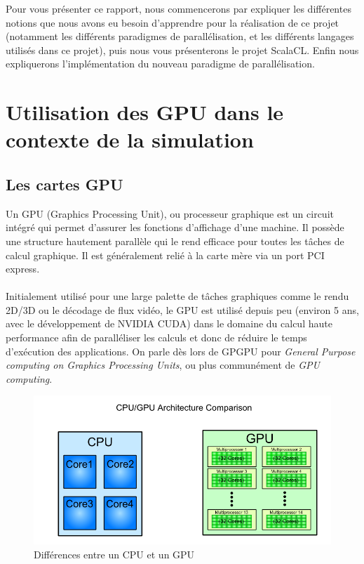 \documentclass[a4paper,11pt]{report}
\begin{document}
\normalsize{
Pour vous présenter ce rapport, nous commencerons par expliquer les différentes notions que nous avons eu besoin d'apprendre pour la réalisation de ce projet (notamment les différents paradigmes de parallélisation, et les différents langages utilisés dans ce projet), puis nous vous présenterons le projet ScalaCL. Enfin nous expliquerons l'implémentation du nouveau paradigme de parallélisation.
}



\newpage


\chapter{Utilisation des GPU dans le contexte de la simulation}

\section{Les cartes GPU}

\normalsize{ 
Un GPU (Graphics Processing Unit), ou processeur graphique est un circuit intégré qui permet d'assurer les fonctions d'affichage d'une machine. Il possède une structure hautement parallèle qui le rend efficace pour toutes les tâches de calcul graphique. Il est généralement relié à la carte mère via un port PCI express.\\ \\

 Initialement utilisé pour une large palette de tâches graphiques comme le rendu 2D/3D ou le décodage de flux vidéo, le GPU est utilisé depuis peu (environ 5 ans, avec le développement de NVIDIA CUDA) dans le domaine du calcul haute performance afin de paralléliser les calculs et donc de réduire le temps d'exécution des applications. On parle dès lors de GPGPU pour \textit{General Purpose computing on Graphics Processing Units}, ou plus communément de \textit{GPU computing}.
}

\begin{figure}[h]
   \begin{center}
   \includegraphics[scale = 0.5]{cpu_vs_gpu.png}
   \end{center}
  \caption{Différences entre un CPU et un GPU}
\end{figure}
\end{document}
